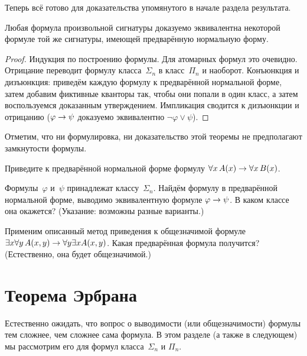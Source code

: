 Теперь всё готово для доказательства упомянутого в начале раздела
результата.

\begin{theorem}
Любая формула
произвольной сигнатуры доказуемо эквивалентна некоторой
формуле той же сигнатуры, имеющей предварённую нормальную
форму.
\end{theorem}

\begin{proof}
Индукция по построению формулы. Для атомарных формул это
очевидно. Отрицание переводит формулу класса~$\Sigma_n$ в
класс~$\Pi_n$ и наоборот. Конъюнкция и дизъюнкция: приведём
каждую формулу к предварённой нормальной форме, затем добавим
фиктивные кванторы так, чтобы они попали в один класс, а затем
воспользуемся доказанным утверждением. Импликация сводится к
дизъюнкции и отрицанию ($\varphi\hm\to\psi$ доказуемо
эквивалентно $\lnot\varphi\lor\psi$).
\end{proof}

Отметим, что ни формулировка, ни доказательство этой теоремы не
предполагают замкнутости формулы.

\begin{problem}
Приведите к предварённой нормальной форме формулу
$\forall x\,A(x)\hm\to\forall x\, B(x)$.
\end{problem}

\begin{problem}
Формулы~$\varphi$ и~$\psi$ принадлежат классу~$\Sigma_n$.
Найдём формулу в предварённой нормальной форме, выводимо
эквивалентную формуле $\varphi\hm\to\psi$. В каком классе
она окажется? (Указание: возможны разные варианты.)
\end{problem}

\begin{problem}
Применим описанный метод приведения к общезначимой формуле $\exists
x\forall y\, A(x,y)\hm\to\forall y\exists x A(x,y)$. Какая
предварённая формула получится? (Естественно, она будет
общезначимой.)
\end{problem}

\section{Теорема Эрбрана}

Естественно ожидать, что вопрос о выводимости (или
общезначимости) формулы тем сложнее, чем сложнее сама формула. В
этом разделе (а также в следующем) мы рассмотрим его для формул
класса~$\Sigma_n$ и $\Pi_n$.

